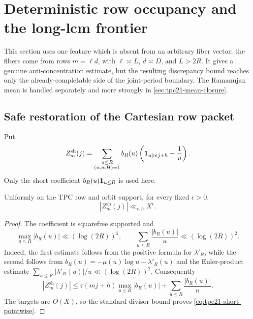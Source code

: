 \section{Deterministic row occupancy and the long-lcm frontier}
\label{sec:tpc21-occupancy-frontier}

This section uses one feature which is absent from an arbitrary fiber
vector: the fibers come from rows \(m=\ell d\), with
\(\ell\asymp L\), \(d\asymp D\), and \(L>2R\).  It gives a genuine
anti-concentration estimate, but the resulting discrepancy bound reaches
only the already-completable side of the joint-period boundary.  The
Ramanujan mean is handled separately and more strongly in
\cref{sec:tpc21-mean-closure}.

\subsection{Safe restoration of the Cartesian row packet}

Put
\begin{equation}
 Z_m^{\mathrm{sh}}(j)
 =\sum_{\substack{u\le R\\(u,mH)=1}}
 b_R(u)\left(\mathbf 1_{u\mid mj+h}-\frac1u\right).
 \label{eq:tpc21-short-signal}
\end{equation}
Only the short coefficient \(b_R(u)\mathbf 1_{u\le R}\) is used here.

\begin{lemma}
\label{lem:tpc21-short-pointwise}
Uniformly on the TPC row and orbit support, for every fixed
\(\epsilon>0\),
\begin{equation}
 |Z_m^{\mathrm{sh}}(j)|\ll_{\epsilon,h}X^\epsilon.
 \label{eq:tpc21-short-pointwise}
\end{equation}
\end{lemma}

\begin{proof}
The coefficient is squarefree supported and
\begin{equation}
 \max_{u\le R}|b_R(u)|\ll (\log(2R))^2,
 \qquad
 \sum_{u\le R}\frac{|b_R(u)|}{u}\ll(\log(2R))^2.
 \label{eq:tpc21-b-short-bounds}
\end{equation}
Indeed, the first estimate follows from the positive formula for
\(\lambda'_R\), while the second follows from
\(b_R(u)=-\mu(u)\log u-\lambda'_R(u)\) and the Euler-product estimate
\(\sum_{u\le R}|\lambda'_R(u)|/u\ll(\log(2R))^2\).
Consequently
\[
 |Z_m^{\mathrm{sh}}(j)|
 \le \tau(mj+h)\max_{u\le R}|b_R(u)|
     +\sum_{u\le R}\frac{|b_R(u)|}{u}.
\]
The targets are \(O(X)\), so the standard divisor bound proves
\eqref{eq:tpc21-short-pointwise}.
\end{proof}

